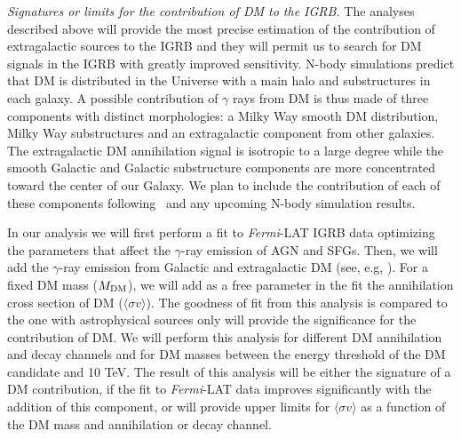 \documentclass[12 pt]{article}
\begin{document}
{\it Signatures or limits for the contribution of DM to the IGRB.}
The analyses described above will provide the most precise estimation of the contribution of extragalactic sources to the IGRB and they will permit us to search for DM signals in the IGRB with greatly improved sensitivity. 
N-body simulations predict that DM is distributed in the Universe with a main halo and substructures in each galaxy.
A possible contribution of $\gamma$ rays from DM is thus made of three components with distinct morphologies: a Milky Way smooth DM distribution, Milky Way substructures and an extragalactic component from other galaxies.
The extragalactic DM annihilation signal is isotropic to a large degree while the smooth Galactic and Galactic substructure components are more concentrated toward the center of our Galaxy.
We plan to include the contribution of each of these components following~\cite{Cirelli:2010xx,Ajello:2015mfa} and any upcoming N-body simulation results.

In our analysis we will first perform a fit to {\it Fermi}-LAT IGRB data optimizing the parameters that affect the $\gamma$-ray emission of AGN and SFGs. 
Then, we will add the $\gamma$-ray emission from Galactic and extragalactic DM (see, e.g, \cite{DiMauro:2015tfa,Ajello:2015mfa}). For a fixed DM mass ($M_{\rm{DM}}$), we will add as a free parameter in the fit the annihilation cross section of DM ($\langle \sigma v \rangle$).
The goodness of fit from this analysis is compared to the one with astrophysical sources only will provide the significance for the contribution of DM.
We will perform this analysis for different DM annihilation and decay channels and for DM masses between the energy threshold of the DM candidate and 10 TeV.
The result of this analysis will be either the signature of a DM contribution, if the fit to {\it Fermi}-LAT data improves significantly with the addition of this component, or will provide upper limits for $\langle \sigma v \rangle$ as a function of the DM mass and annihilation or decay channel.

\end{document}
